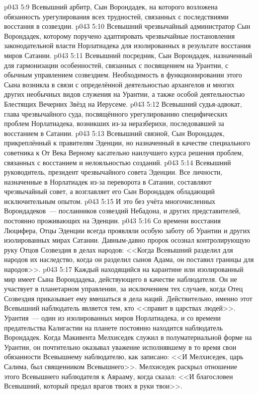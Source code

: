 \vs p043 5:9 Всевышний арбитр, Сын Ворондадек, на которого возложена обязанность урегулирования всех трудностей, связанных с последствиями восстания в созвездии.
\vs p043 5:10 Всевышний чрезвычайный администратор Сын Ворондадек, которому поручено адаптировать чрезвычайные постановления законодательной власти Норлатиадека для изолированных в результате восстания миров Сатании.
\vs p043 5:11 Всевышний посредник, Сын Ворондадек, назначенный для гармонизации особенностей, связанных с посвящением на Урантии, с обычным управлением созвездием. Необходимость в функционировании этого Сына возникла в связи с определённой деятельностью архангелов и многих других необычных видов служения на Урантии, а также особой деятельностью Блестящих Вечерних Звёзд на Иерусеме.
\vs p043 5:12 Всевышний судья\hyp{}адвокат, глава чрезвычайного суда, посвящённого урегулированию специфических проблем Норлатиадека, возникших из-за неразберихи, последовавшей за восстанием в Сатании.
\vs p043 5:13 Всевышний связной, Сын Ворондадек, прикреплённый к правителям Эденции, но назначенный в качестве специального советника к От Века Верному касательно наилучшего курса решения проблем, связанных с восстанием и нелояльностью созданий.
\vs p043 5:14 Всевышний руководитель, президент чрезвычайного совета Эденции. Все личности, назначенные в Норлатиадек из-за переворота в Сатании, составляют чрезвычайный совет, а возглавляет его Сын Ворондадек обладающий исключительным опытом.
\vs p043 5:15 И это без учёта многочисленных Ворондадеков~--- посланников созвездий Небадона, и других представителей, постоянно проживающих на Эденции.
\vs p043 5:16 \pc Со времени восстания Люцифера, Отцы Эденции всегда проявляли особую заботу об Урантии и других изолированных мирах Сатании. Давным\hyp{}давно пророк осознал контролирующую руку Отцов Созвездия в делах народов: <<Когда Всевышний разделил для народов их наследство, когда он разделил сынов Адама, он поставил границы для народов>>.
\vs p043 5:17 Каждый находящийся на карантине или изолированный мир имеет Сына Ворондадека, действующего в качестве наблюдателя. Он не участвует в планетарном управлении, за исключением тех случаев, когда Отец Созвездия приказывает ему вмешаться в дела наций. Действительно, именно этот Всевышний наблюдатель является тем, кто <<правит в царствах людей>>. Урантия~--- один из изолированных миров Норлатиадека, и со времени предательства Калигастии на планете постоянно находится наблюдатель Ворондадек. Когда Макивента Мелхиседек служил в полуматериальной форме на Урантии, он почтительно оказывал уважение исполнявшему в то время свои обязанности Всевышнему наблюдателю, как записано: <<И Мелхиседек, царь Салима, был священником Всевышнего>>. Мелхиседек раскрыл отношение этого Всевышнего наблюдателя к Аврааму, когда сказал: <<И благословен Всевышний, который предал врагов твоих в руки твои>>.
